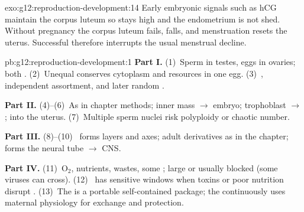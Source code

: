 \begin{solution}{exo:g12:reproduction-development:14}
Early embryonic signals such as hCG maintain the corpus luteum so 
stays high and the endometrium is not shed. Without pregnancy the corpus
luteum fails,  falls, and menstruation resets the uterus.
Successful  therefore interrupts the usual menstrual decline.
\end{solution}

\begin{solution}{pb:g12:reproduction-development:1}
\textbf{Part I.} (1)~Sperm in testes, eggs in ovaries; both .
(2)~Unequal  conserves cytoplasm and resources in one egg.
(3)~, independent assortment, and later random .

\textbf{Part II.} (4)--(6)~As in chapter methods; inner  mass $\to$ embryo;
trophoblast $\to$ ;  into the uterus.
(7)~Multiple sperm nuclei risk polyploidy or chaotic  number.

\textbf{Part III.} (8)--(10)~ forms layers and axes; adult
derivatives as in the chapter;  forms the neural tube $\to$ CNS.

\textbf{Part IV.} (11)~$\mathrm{O_2}$, nutrients, wastes, some ;
large  or  usually blocked (some viruses can cross).
(12)~ has sensitive windows when toxins or poor nutrition
disrupt . (13)~The  is a portable self-contained
package; the  continuously uses maternal physiology for exchange and
protection.
\end{solution}
